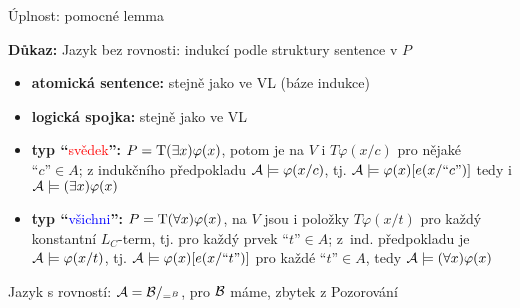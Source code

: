 \documentclass{beamer}
\begin{document}
\begin{frame}{Úplnost: pomocné lemma}


    \textbf{Důkaz:}
    \alert{Jazyk bez rovnosti:} indukcí podle struktury sentence v $P$

    \begin{itemize}
        \item \textbf{atomická sentence:} stejně jako ve VL (\alert{báze indukce})
        
        \medskip

        \item \textbf{logická spojka:} stejně jako ve VL
        
        \medskip

        \item \textbf{typ ``}\textcolor{red}{svědek}\textbf{'':} \alert{$P=\mathrm{T}(\exists x)\varphi(x)$}, potom je na $V$ i $T\varphi(x/c)$ pro nějaké $\text{``$c$''}\in A$; z indukčního předpokladu $\mathcal{A}\models\varphi(x/c)$, tj. $\mathcal{A}\models\varphi(x)[e(x/\text{``$c$''})]$ tedy i $\mathcal{A}\models(\exists x)\varphi(x)$

        \medskip

        \item \textbf{typ ``}\textcolor{blue}{všichni}\textbf{'':} \alert{$P=\mathrm{T}(\forall x)\varphi(x)$}, na $V$ jsou i položky $T\varphi(x/t)$ pro každý konstantní $L_C$-term, tj. pro každý prvek $\text{``$t$''}\in A$; z~ind. předpokladu je $\mathcal{A}\models\varphi(x/t)$, tj. $\mathcal{A}\models\varphi(x)[e(x/\text{``$t$''})]$ pro každé $\text{``$t$''}\in A$, tedy $\mathcal{A}\models(\forall x)\varphi(x)$
        
    \end{itemize}

    \alert{Jazyk s rovností:} $\mathcal{A}=\mathcal{B}/_{=^B}$, pro $\mathcal{B}$ máme, zbytek z Pozorování \hfill\qedsymbol

\end{frame}
\end{document}
